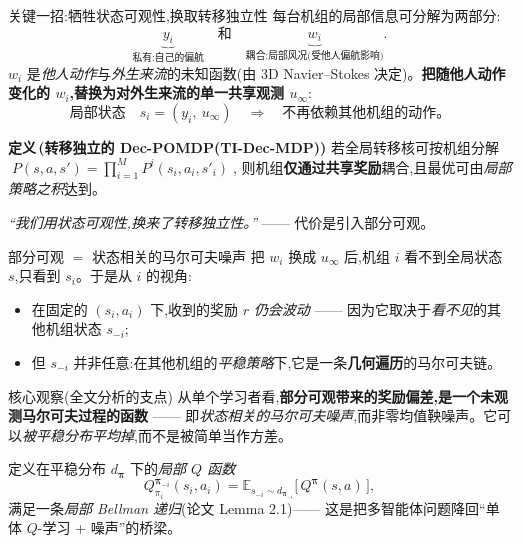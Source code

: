 \documentclass[aspectratio=169,11pt,UTF8]{ctexbeamer}
\newcommand{\E}{\mathbb{E}}
\newcommand{\bpi}{\bm{\pi}}
\newcommand{\wind}{u_{\infty}}
\newcommand{\emphb}[1]{\textcolor{myred}{\textbf{#1}}}
\newenvironment{defbox}[1]{\begin{block}{\color{myblue}\bfseries 定义\,(#1)}}{\end{block}}
\begin{document}
\begin{frame}{关键一招:牺牲状态可观性,换取转移独立性}
\small
每台机组的局部信息可分解为两部分:
\[
\underbrace{y_i}_{\text{私有:自己的偏航}}\quad\text{和}\quad
\underbrace{w_i}_{\text{耦合:局部风况(受他人偏航影响)}}.
\]
$w_i$ 是\emph{他人动作}与\emph{外生来流}的未知函数(由 3D Navier--Stokes 决定)。\emphb{把随他人动作变化的 $w_i$,替换为对外生来流的单一共享观测 $\wind$}:
\[
\text{局部状态}\quad s_i=(y_i,\ \wind)\quad\Longrightarrow\quad \text{不再依赖其他机组的动作。}
\]
\begin{defbox}{转移独立的 Dec-POMDP(TI-Dec-MDP)}
若全局转移核可按机组分解
$\;P(s,a,s')=\prod_{i=1}^{M}P^i(s_i,a_i,s'_i)\;$,
则机组\emphb{仅通过共享奖励}耦合,且最优可由\emph{局部策略之积}达到。
\end{defbox}
\centering
\emph{“我们用状态可观性,换来了转移独立性。”} —— 代价是引入部分可观。
\end{frame}

\begin{frame}{部分可观 $=$ 状态相关的马尔可夫噪声}
\small
把 $w_i$ 换成 $\wind$ 后,机组 $i$ 看不到全局状态 $s$,只看到 $s_i$。于是从 $i$ 的视角:
\begin{itemize}\setlength\itemsep{2pt}
  \item 在固定的 $(s_i,a_i)$ 下,收到的奖励 $r$ \emph{仍会波动} —— 因为它取决于\emph{看不见}的其他机组状态 $s_{-i}$;
  \item 但 $s_{-i}$ 并非任意:在其他机组的\emph{平稳策略}下,它是一条\emphb{几何遍历}的马尔可夫链。
\end{itemize}
\begin{block}{核心观察(全文分析的支点)}
从单个学习者看,\emphb{部分可观带来的奖励偏差,是一个未观测马尔可夫过程的函数} —— 即\emph{状态相关的马尔可夫噪声},而非零均值鞅噪声。它可以\emph{被平稳分布平均掉},而不是被简单当作方差。
\end{block}
定义在平稳分布 $d_{\bpi}$ 下的\emph{局部 $Q$ 函数}
\[
Q^{\bpi_{-i}}_{\pi_i}(s_i,a_i)=\E_{s_{-i}\sim d_{\bpi_{-i}}}\!\big[\,Q^{\bpi}(s,a)\,\big],
\]
满足一条\emph{局部 Bellman 递归}(论文 Lemma 2.1)—— 这是把多智能体问题降回“单体 $Q$-学习 + 噪声”的桥梁。
\end{frame}
\end{document}
